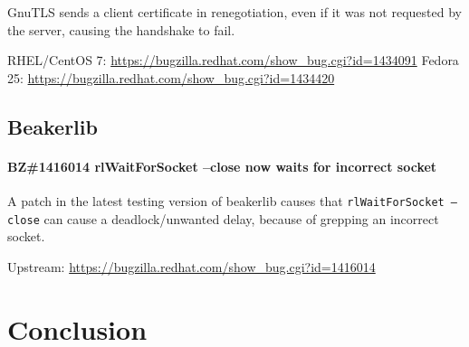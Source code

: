     GnuTLS sends a client certificate in renegotiation, even if it was not
    requested by the server, causing the handshake to fail.

    \medskip\noindent RHEL/CentOS 7: \url{https://bugzilla.redhat.com/show_bug.cgi?id=1434091}
    \newline\noindent Fedora 25: \url{https://bugzilla.redhat.com/show_bug.cgi?id=1434420}

\section{Beakerlib}
\subsubsection*{BZ\#1416014  \newline
    rlWaitForSocket --close now waits for incorrect socket}

    A patch in the latest testing version of beakerlib causes that
    \texttt{rlWaitForSocket --close} can cause a deadlock/unwanted delay,
    because of grepping an incorrect socket.

    \medskip\noindent Upstream: \url{https://bugzilla.redhat.com/show_bug.cgi?id=1416014}

\chapter {Conclusion} \label{chap:conclusion}

